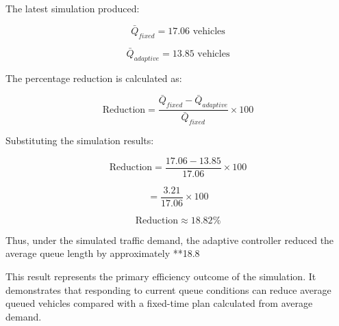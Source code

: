 \documentclass{article}
\begin{document}
The latest simulation produced:

$$
\bar Q_{fixed}=17.06\text{ vehicles}
$$

$$
\bar Q_{adaptive}=13.85\text{ vehicles}
$$

The percentage reduction is calculated as:

$$
\text{Reduction}=
\frac{\bar Q_{fixed}-\bar Q_{adaptive}}
{\bar Q_{fixed}}\times100
$$

Substituting the simulation results:

$$
\text{Reduction}=
\frac{17.06-13.85}{17.06}\times100
$$

$$
=\frac{3.21}{17.06}\times100
$$

$$
\boxed{\text{Reduction}\approx18.82\%}
$$

Thus, under the simulated traffic demand, the adaptive controller reduced the average queue length by approximately **18.8%

This result represents the primary efficiency outcome of the simulation. It demonstrates that responding to current queue conditions can reduce average queued vehicles compared with a fixed-time plan calculated from average demand.
\end{document}
